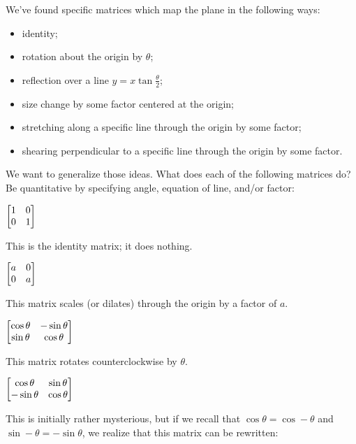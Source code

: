 \documentclass[../gatm_answers.tex]{subfiles}
\begin{document}
\begin{outer_problem}
\item We've found specific matrices which map the plane in the following ways:
\begin{itemize}
\item identity;
\item rotation about the origin by $\theta$;
\item reflection over a line $y=x \tan\frac{\theta}{2}$;
\item size change by some factor centered at the origin;
\item stretching along a specific line through the origin by some factor;
\item shearing perpendicular to a specific line through the origin by some factor.
\end{itemize}
We want to generalize those ideas. What does each of the following matrices do? Be quantitative by specifying angle, equation of line, and/or factor:\label{prob:list_transformations}
\end{outer_problem}

\begin{inner_problem}[start=1]
\item $\begin{bmatrix} 1 & 0 \\ 0 & 1 \end{bmatrix}$ \label{prob:list_transformations_part_start}
\end{inner_problem}

This is the identity matrix; it does nothing.

\begin{inner_problem}
\item $\begin{bmatrix} a & 0 \\ 0 & a \end{bmatrix}$
\end{inner_problem}

This matrix scales (or dilates) through the origin by a factor of $a$.

\begin{inner_problem}
\item $\begin{bmatrix} \cos\theta & -\sin\theta \\ \sin\theta & \cos\theta \end{bmatrix}$
\end{inner_problem}

This matrix rotates counterclockwise by $\theta$.

\begin{inner_problem}
\item $\begin{bmatrix} \cos\theta & \sin\theta \\ -\sin\theta & \cos\theta \end{bmatrix}$
\end{inner_problem}

This is initially rather mysterious, but if we recall that $\cos\theta = \cos-\theta$ and $\sin-\theta = -\sin\theta$, we realize that this matrix can be rewritten:
\end{document}
